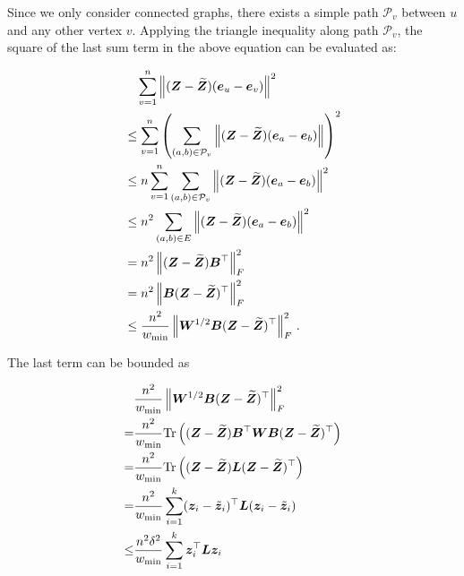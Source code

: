 \documentclass[10pt,twocolumn,twoside]{IEEEtran}
\begin{document}
\begin{IEEEproof}
    Since we only consider connected graphs,   there exists a simple path \(\mathcal{P}_v\) between \(u\) and any other vertex \(v\).  Applying the triangle inequality along path \(\mathcal{P}_v\), the square of the last sum term in the above equation can be evaluated as:
    \begin{small}
        \begin{align*}
             & \quad \sum_{v=1}^{n} \left\Vert(\boldsymbol{Z}-\widetilde{\boldsymbol{Z}})(\boldsymbol{e}_u-\boldsymbol{e}_v)\right\Vert^2                                                 \\
             & \le \sum_{v=1}^{n} \left(\sum_{\left( a,b \right) \in \mathcal{P}_v} \left\Vert(\boldsymbol{Z}-\widetilde{\boldsymbol{Z}})(\boldsymbol{e}_a-\boldsymbol{e}_b)\right\Vert\right)^2 \\
             & \le n \sum_{v=1}^{n} \sum_{\left( a,b \right) \in \mathcal{P}_v} \left\Vert(\boldsymbol{Z}-\widetilde{\boldsymbol{Z}})(\boldsymbol{e}_a-\boldsymbol{e}_b)\right\Vert^2            \\
             & \le n^2 \sum_{\left( a,b \right) \in E} \left\Vert(\boldsymbol{Z}-\widetilde{\boldsymbol{Z}})(\boldsymbol{e}_a-\boldsymbol{e}_b)\right\Vert^2                                     \\
             & = n^2 \left\Vert(\boldsymbol{Z} - \widetilde{\boldsymbol{Z}} ) \boldsymbol{B}^{\top}\right\Vert_{F}^{2}                                                           \\
             & = n^2 \left\Vert\boldsymbol{B}(\boldsymbol{Z} - \widetilde{\boldsymbol{Z}} )^{\top}\right\Vert_{F}^{2}                                                            \\
             & \leq
            \frac{n^2}{w_{\min}} \left\Vert\boldsymbol{W}^{1/2} \boldsymbol{B}(\boldsymbol{Z} - \widetilde{\boldsymbol{Z}} )^{\top}\right\Vert_{F}^{2}\,.
        \end{align*}
    \end{small}
    The last term can be bounded as
    \begin{small}
        \begin{align*}
                & \frac{n^2}{w_{\min}} \Abs{\matw^{1/2} \matb(\matz - \tilmatz )^{\top}}_{F}^{2}                      \\
            =   & \frac{n^2}{w_{\min}} \trace{(\matz - \tilmatz )\matb^{\top} \matw \matb(\matz - \tilmatz )^{\top}}  \\
            =   & \frac{n^2}{w_{\min}} \trace{(\matz - \tilmatz )\lap(\matz - \tilmatz )^{\top}}                      \\
            =   & \frac{n^2}{w_{\min}} \sum_{i=1}^k (\vecz_i - \tilde{\vecz}_i)^\top \lap (\vecz_i - \tilde{\vecz}_i) \\
            \le & \frac{n^2\delta^2}{w_{\min}} \sum_{i=1}^k \vecz_i^\top\lap\vecz_i                                   \\

\end{align*}
\end{small}
\end{IEEEproof}
\end{document}
